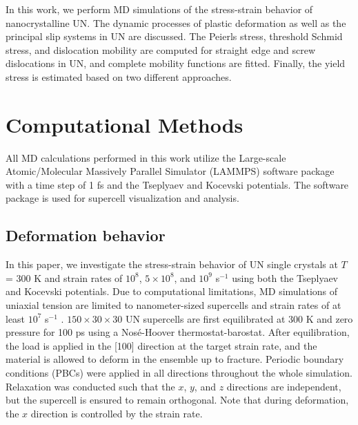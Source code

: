 \documentclass[applsci,article,submit,pdftex,moreauthors]{Definitions/mdpi}
\newcommand{\?}{\stackrel{?}{=}}
\providecommand{\DIFadd}[1]{{\bf #1}} %
\providecommand{\DIFdel}[1]{} %
\providecommand{\DIFaddbegin}{\protect\color{blue}} %
\providecommand{\DIFaddend}{\protect\color{black}} %
\providecommand{\DIFdelbegin}{\protect\color{red}} %
\providecommand{\DIFdelend}{\protect\color{black}} %
\newcommand{\DIFscaledelfig}{0.5}
\newlength{\DIFdelgraphicswidth} %
\newlength{\DIFdelgraphicsheight} %
\newcommand{\DIFaddincludegraphics}[2][]{{\color{blue}\fbox{\DIFOincludegraphics[#1]{#2}}}} %
\newcommand{\DIFdelincludegraphics}[2][]{%
\sbox{\DIFdelgraphicsbox}{\DIFOincludegraphics[#1]{#2}}%
\settoboxwidth{\DIFdelgraphicswidth}{\DIFdelgraphicsbox} %
\settoboxtotalheight{\DIFdelgraphicsheight}{\DIFdelgraphicsbox} %
\scalebox{\DIFscaledelfig}{%
\parbox[b]{\DIFdelgraphicswidth}{\usebox{\DIFdelgraphicsbox}\\[-\baselineskip] \rule{\DIFdelgraphicswidth}{0em}}\llap{\resizebox{\DIFdelgraphicswidth}{\DIFdelgraphicsheight}{%
\setlength{\unitlength}{\DIFdelgraphicswidth}%
\begin{picture}(1,1)%
\thicklines\linethickness{2pt} %
{\color[rgb]{1,0,0}\put(0,0){\framebox(1,1){}}}%
{\color[rgb]{1,0,0}\put(0,0){\line( 1,1){1}}}%
{\color[rgb]{1,0,0}\put(0,1){\line(1,-1){1}}}%
\end{picture}%
}\hspace*{3pt}}} %
} %
\DeclareRobustCommand{\DIFaddbegin}{\DIFOaddbegin \let\includegraphics\DIFaddincludegraphics} %
\DeclareRobustCommand{\DIFaddend}{\DIFOaddend \let\includegraphics\DIFOincludegraphics} %
\DeclareRobustCommand{\DIFdelbegin}{\DIFOdelbegin \let\includegraphics\DIFdelincludegraphics} %
\DeclareRobustCommand{\DIFdelend}{\DIFOaddend \let\includegraphics\DIFOincludegraphics} %
\begin{document}
In this work, we perform MD simulations of the stress-strain behavior of nanocrystalline UN. The dynamic processes of plastic deformation as well as the principal slip systems in UN are discussed. The Peierls stress, threshold Schmid stress, and dislocation mobility are computed for straight edge and screw dislocations in UN, and complete mobility functions are fitted. Finally, the yield stress is estimated based on two different approaches.

\section{Computational Methods}

All MD calculations performed in this work utilize the Large-scale Atomic/Molecular Massively Parallel Simulator (LAMMPS) software package \cite{Thompson2022} with a time step of 1 fs and the Tseplyaev \cite{Tseplyaev2016} and Kocevski \cite{Kocevski2022II} potentials. The \DIFdelbegin \DIFdel{OVITO }\DIFdelend \DIFaddbegin \DIFadd{Open Visualization Tool (OVITO) }\DIFaddend software package \cite{Stukowski2010} is used for supercell visualization and analysis.

\subsection{Deformation behavior}

In this paper, we investigate the stress-strain behavior of UN single crystals at $T$ = 300 K and strain rates of $10^8$, $5 \times 10^8$, and $10^9$ s$^{-1}$ using both the Tseplyaev and Kocevski potentials. Due to computational limitations, MD simulations of uniaxial tension are limited to nanometer-sized supercells and strain rates of at least $10^7$ s$^{-1}$ \cite{Lao2013}. $150 \times 30 \times 30$ UN supercells are first equilibrated at 300 K and zero pressure for 100 ps using a Nosé-Hoover thermostat-barostat. After equilibration, the load is applied in the [100] direction at the target strain rate, and the material is allowed to deform in the \DIFdelbegin \DIFdel{\textit{NPT} }\DIFdelend \DIFaddbegin \DIFadd{isothermal-isobaric (\textit{NPT}) }\DIFaddend ensemble up to fracture. Periodic boundary conditions (PBCs) were applied in all directions throughout the whole simulation. Relaxation was conducted such that the $x$, $y$, and $z$ directions are independent, but the supercell is ensured to remain orthogonal. Note that during deformation, the $x$ direction is controlled by the strain rate.
\end{document}

